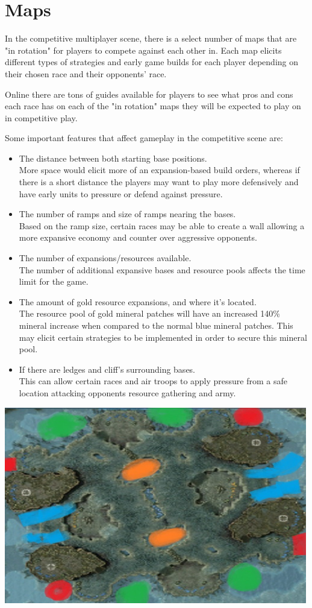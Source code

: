 \documentclass[a4paper,12pt]{report}
\begin{document}
\section{Maps}

In the competitive multiplayer scene, there is a select number of maps that are "in rotation" for players to compete against each other in. Each map elicits different types of strategies and early game builds for each player depending on their chosen race and their opponents’ race.

Online there are tons of guides available for players to see what pros and cons each race has on each of the "in rotation" maps they will be expected to play on in competitive play.

Some important features that affect gameplay in the competitive scene are:

\begin{itemize}
\item The distance between both starting base positions. \\
More space would elicit more of an expansion-based build orders, whereas if there is a short distance the players may want to play more defensively and have early units to pressure or defend against pressure.
\item The number of ramps and size of ramps nearing the bases. \\
Based on the ramp size, certain races may be able to create a wall allowing a more expansive economy and counter over aggressive opponents.
\item The number of expansions/resources available. \\
The number of additional expansive bases and resource pools affects the time limit for the game.
\item The amount of gold resource expansions, and where it’s located. \\
The resource pool of gold mineral patches will have an increased 140\% mineral increase when compared to the normal blue mineral patches. This may elicit certain strategies to be implemented in order to secure this mineral pool.
\item If there are ledges and cliff’s surrounding bases. \\
This can allow certain races and air troops to apply pressure from a safe location attacking opponents resource gathering and army.
\end{itemize}

\begin{center}
    \captionsetup{type=figure}
    \includegraphics[width=.5\linewidth]{media/mapgeo.png}
\end{center}
\end{document}

